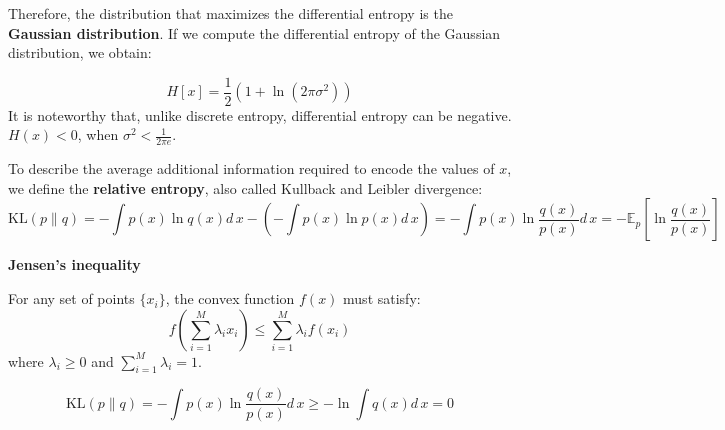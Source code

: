 \documentclass[../main.tex]{subfiles}
\begin{document}
Therefore, the distribution that maximizes the differential entropy is the \textbf{Gaussian distribution}. If we compute the differential entropy of the Gaussian distribution, we obtain:

$$
H[x]=\frac{1}{2}(1+\ln(2\pi\sigma^2))
$$
It is noteworthy that, unlike discrete entropy, differential entropy can be negative.
$H(x)<0$, when $\sigma^2<\frac{1}{2\pi e}$.

To describe the average additional information required to encode the values of $x$, we define the \textbf{relative entropy}, also called  Kullback and Leibler divergence:
$$
\text{KL}(p\parallel q)=-\int p(x)\ln q(x)d\,x-(-\int p(x)\ln p(x)d\,x)=-\int p(x)\ln\frac{q(x)}{p(x)}d\,x=-\mathbb{E}_p[\ln\frac{q(x)}{p(x)}]
$$
\begin{yellow}
\begin{theorem}
\textbf{Jensen's inequality}

For any set of points $\{x_i\}$, the convex function $f(x)$ must satisfy:
$$
f(\sum_{i=1}^{M}\lambda_ix_i)\leqslant\sum_{i=1}^{M}\lambda_if(x_i)
$$
where $\lambda_i\geqslant0$ and $\sum_{i=1}^{M}\lambda_i=1$.
\end{theorem}
\end{yellow}
$$
\text{KL}(p\parallel q)=-\int p(x)\ln\frac{q(x)}{p(x)}d\,x\geqslant-\ln\int q(x)d\, x=0
$$
\end{document}
